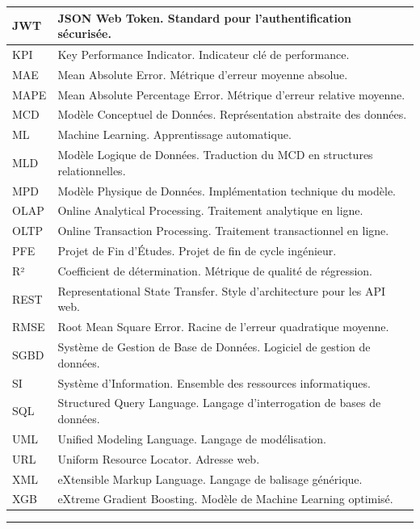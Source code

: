 \begin{longtable}{|p{3cm}|p{11cm}|}
\hline
JWT & JSON Web Token. Standard pour l'authentification sécurisée. \\
\hline
KPI & Key Performance Indicator. Indicateur clé de performance. \\
\hline
MAE & Mean Absolute Error. Métrique d'erreur moyenne absolue. \\
\hline
MAPE & Mean Absolute Percentage Error. Métrique d'erreur relative moyenne. \\
\hline
MCD & Modèle Conceptuel de Données. Représentation abstraite des données. \\
\hline
ML & Machine Learning. Apprentissage automatique. \\
\hline
MLD & Modèle Logique de Données. Traduction du MCD en structures relationnelles. \\
\hline
MPD & Modèle Physique de Données. Implémentation technique du modèle. \\
\hline
OLAP & Online Analytical Processing. Traitement analytique en ligne. \\
\hline
OLTP & Online Transaction Processing. Traitement transactionnel en ligne. \\
\hline
PFE & Projet de Fin d'Études. Projet de fin de cycle ingénieur. \\
\hline
R² & Coefficient de détermination. Métrique de qualité de régression. \\
\hline
REST & Representational State Transfer. Style d'architecture pour les API web. \\
\hline
RMSE & Root Mean Square Error. Racine de l'erreur quadratique moyenne. \\
\hline
SGBD & Système de Gestion de Base de Données. Logiciel de gestion de données. \\
\hline
SI & Système d'Information. Ensemble des ressources informatiques. \\
\hline
SQL & Structured Query Language. Langage d'interrogation de bases de données. \\
\hline
UML & Unified Modeling Language. Langage de modélisation. \\
\hline
URL & Uniform Resource Locator. Adresse web. \\
\hline
XML & eXtensible Markup Language. Langage de balisage générique. \\
\hline
XGB & eXtreme Gradient Boosting. Modèle de Machine Learning optimisé. \\
\hline
\end{longtable}

\vspace{0.5cm}
\hrule
\vspace{0.2cm}